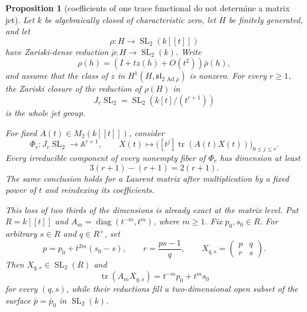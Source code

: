 \documentclass[11pt,reqno]{amsart}
\newtheorem{proposition}[theorem]{Proposition}
\theoremstyle{definition}
\theoremstyle{remark}
\newcommand{\Tr}{\operatorname{tr}}
\newcommand{\SL}{\operatorname{SL}}
\newcommand{\Ad}{\operatorname{Ad}}
\newcommand{\diag}{\operatorname{diag}}
\begin{document}
\begin{proposition}[coefficients of one trace functional do not determine a matrix jet]
\label{prop:one-trace-jet-obstruction}
Let \(k\) be algebraically closed of characteristic zero, let \(H\) be
finitely generated, and let
\[
 \rho\colon H\longrightarrow\SL_2(k[[t]])
\]
have Zariski-dense reduction
\(\bar\rho\colon H\to\SL_2(k)\).  Write
\[
 \rho(h)=(I+t z(h)+O(t^2))\bar\rho(h),
\]
and assume that the class of \(z\) in
\(H^1(H,\mathfrak{sl}_2{}_{\Ad\bar\rho})\) is nonzero.  For every
\(r\ge1\), the Zariski closure of the reduction of \(\rho(H)\) in
\[
 J_r\SL_2=\SL_2(k[t]/(t^{r+1}))
\]
is the whole jet group.

For fixed \(A(t)\in M_2(k[[t]])\), consider
\[
 \Phi_r\colon J_r\SL_2\longrightarrow\mathbb A^{r+1},\qquad
 X(t)\longmapsto
 \bigl([t^j]\Tr(A(t)X(t))\bigr)_{0\le j\le r}.
\]
Every irreducible component of every nonempty fiber of \(\Phi_r\) has
dimension at least
\[
 3(r+1)-(r+1)=2(r+1).
\]
The same conclusion holds for a Laurent matrix after multiplication by a
fixed power of \(t\) and reindexing its coefficients.

This loss of two thirds of the dimensions is already exact at the matrix
level.  Put \(R=k[[t]]\) and
\(A_m=\diag(t^{-m},t^m)\), where \(m\ge1\).  Fix
\(p_0,s_0\in R\).  For arbitrary \(s\in R\) and \(q\in R^\times\), set
\[
 p=p_0+t^{2m}(s_0-s),\qquad
 r=\frac{ps-1}{q},\qquad
 X_{q,s}=\begin{pmatrix}p&q\\r&s\end{pmatrix}.
\]
Then \(X_{q,s}\in\SL_2(R)\) and
\[
 \Tr(A_mX_{q,s})=t^{-m}p_0+t^m s_0
\]
for every \((q,s)\), while their reductions fill a two-dimensional open
subset of the surface \(\bar p=\bar p_0\) in \(\SL_2(k)\).
\end{proposition}
\end{document}
